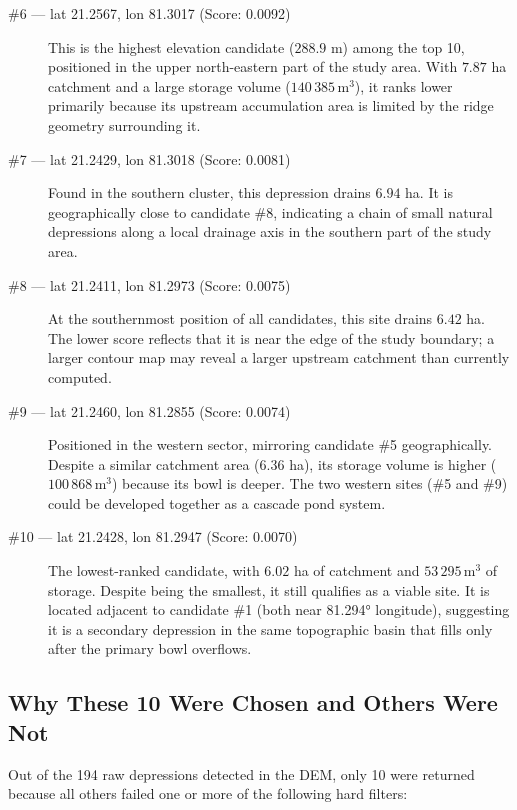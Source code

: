 \documentclass[12pt,a4paper]{article}
\begin{document}
\begin{description}
    \item[\#6 --- lat 21.2567, lon 81.3017 (Score: 0.0092)]
    This is the highest elevation candidate ($288.9$ m) among the top 10, positioned in
    the upper north-eastern part of the study area. With $7.87$ ha catchment and a large
    storage volume ($140\,385\,\text{m}^3$), it ranks lower primarily because its upstream
    accumulation area is limited by the ridge geometry surrounding it.

    \item[\#7 --- lat 21.2429, lon 81.3018 (Score: 0.0081)]
    Found in the southern cluster, this depression drains $6.94$ ha. It is geographically
    close to candidate \#8, indicating a chain of small natural depressions along a local
    drainage axis in the southern part of the study area.

    \item[\#8 --- lat 21.2411, lon 81.2973 (Score: 0.0075)]
    At the southernmost position of all candidates, this site drains $6.42$ ha. The lower
    score reflects that it is near the edge of the study boundary; a larger contour map
    may reveal a larger upstream catchment than currently computed.

    \item[\#9 --- lat 21.2460, lon 81.2855 (Score: 0.0074)]
    Positioned in the western sector, mirroring candidate \#5 geographically. Despite a
    similar catchment area ($6.36$ ha), its storage volume is higher ($100\,868\,\text{m}^3$)
    because its bowl is deeper. The two western sites (\#5 and \#9) could be developed
    together as a cascade pond system.

    \item[\#10 --- lat 21.2428, lon 81.2947 (Score: 0.0070)]
    The lowest-ranked candidate, with $6.02$ ha of catchment and $53\,295\,\text{m}^3$
    of storage. Despite being the smallest, it still qualifies as a viable site. It is
    located adjacent to candidate \#1 (both near 81.294° longitude), suggesting it is
    a secondary depression in the same topographic basin that fills only after the
    primary bowl overflows.

\end{description}

\subsection{Why These 10 Were Chosen and Others Were Not}

Out of the 194 raw depressions detected in the DEM, only 10 were returned because all
others failed one or more of the following hard filters:
\end{document}
